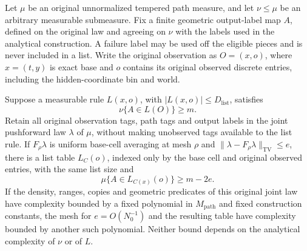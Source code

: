 \begin{lemma}\label{a03:actual-lists}
Let \(\mu\) be an original unnormalized tempered path measure, and let
\(\nu\le\mu\) be an arbitrary measurable submeasure.  Fix a finite
geometric output-label map \(A\), defined on the original law and
agreeing on \(\nu\) with the labels used in the analytical construction.
A failure label may be used off the eligible pieces and is never
included in a list.  Write the original observation as
\(O=(x,o)\), where \(x=(t,y)\) is exact base and \(o\) contains its
original observed discrete entries, including the hidden-coordinate
bin and world.

Suppose a measurable rule \(L(x,o)\), with
\(|L(x,o)|\le D_{\mathrm{list}}\), satisfies
\begin{equation}
\nu\{A\in L(O)\}\ge m.
 \label{a03:masked-success}
\end{equation}
Retain all original observation tags, path tags and output labels in
the joint pushforward law \(\lambda\) of \(\mu\), without making
unobserved tags available to the list rule.  If \(F_\rho\lambda\) is
uniform base-cell averaging at mesh \(\rho\) and
\(\|\lambda-F_\rho\lambda\|_{\mathrm{TV}}\le e\), there is a list table
\(L_C(o)\), indexed only by the base cell and original observed
entries, with the same list size and
\begin{equation}
\mu\{A\in L_{C(x)}(o)\}\ge m-2e.
 \label{a03:cell-list-success}
\end{equation}
If the density, ranges, copies and geometric predicates of this
original joint law have complexity bounded by a fixed polynomial in
\(M_{\mathrm{path}}\) and fixed construction constants, the mesh for
\(e=O(N_0^{-1})\) and the resulting table have complexity bounded by
another such polynomial.  Neither bound depends on the analytical
complexity of \(\nu\) or of \(L\).
\end{lemma}
